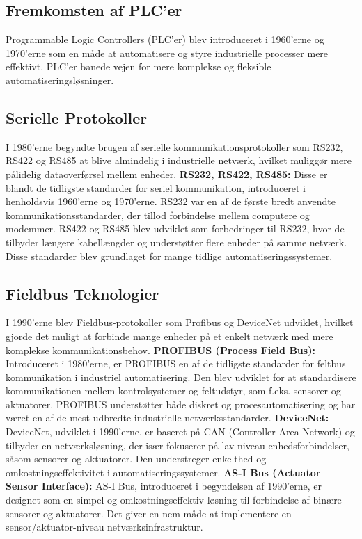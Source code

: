 \subsection{Fremkomsten af PLC'er}
Programmable Logic Controllers (PLC'er) blev introduceret i 1960'erne og 1970'erne som en måde at automatisere og styre industrielle processer mere effektivt. PLC'er banede vejen for mere komplekse og fleksible automatiseringsløsninger.

\subsection{Serielle Protokoller}
I 1980'erne begyndte brugen af serielle kommunikationsprotokoller som RS232, RS422 og RS485 at blive almindelig i industrielle netværk, hvilket muliggør mere pålidelig dataoverførsel mellem enheder.
\newline\newline\noindent\textbf{RS232, RS422, RS485:} Disse er blandt de tidligste standarder for seriel kommunikation, introduceret i henholdsvis 1960'erne og 1970'erne. RS232 var en af de første bredt anvendte kommunikationsstandarder, der tillod forbindelse mellem computere og modemmer. RS422 og RS485 blev udviklet som forbedringer til RS232, hvor de tilbyder længere kabellængder og understøtter flere enheder på samme netværk. Disse standarder blev grundlaget for mange tidlige automatiseringssystemer.

\subsection{Fieldbus Teknologier}
I 1990'erne blev Fieldbus-protokoller som Profibus og DeviceNet udviklet, hvilket gjorde det muligt at forbinde mange enheder på et enkelt netværk med mere komplekse kommunikationsbehov.
\newline\newline\noindent\textbf{PROFIBUS (Process Field Bus):} Introduceret i 1980'erne, er PROFIBUS en af de tidligste standarder for feltbus kommunikation i industriel automatisering. Den blev udviklet for at standardisere kommunikationen mellem kontrolsystemer og feltudstyr, som f.eks. sensorer og aktuatorer. PROFIBUS understøtter både diskret og procesautomatisering og har været en af de mest udbredte industrielle netværksstandarder.
\newline\newline\noindent\textbf{DeviceNet:} DeviceNet, udviklet i 1990'erne, er baseret på CAN (Controller Area Network) og tilbyder en netværksløsning, der især fokuserer på lav-niveau enhedsforbindelser, såsom sensorer og aktuatorer. Den understreger enkelthed og omkostningseffektivitet i automatiseringssystemer.
\newline\newline\noindent\textbf{AS-I Bus (Actuator Sensor Interface):} AS-I Bus, introduceret i begyndelsen af 1990'erne, er designet som en simpel og omkostningseffektiv løsning til forbindelse af binære sensorer og aktuatorer. Det giver en nem måde at implementere en sensor/aktuator-niveau netværksinfrastruktur.

